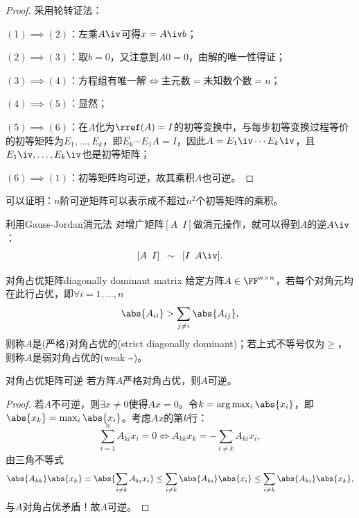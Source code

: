 \begin{proof}
	采用轮转证法：

	$(1)\implies(2)$：左乘$A\iv$可得$x=A\iv b$；

	$(2)\implies(3)$：取$b=0$，又注意到$A0=0$，由解的唯一性得证；

	$(3)\implies(4)$：方程组有唯一解$\iff$主元数$=$未知数个数$=n$；

	$(4)\implies(5)$：显然；

	$(5)\implies(6)$：在$A$化为$\rref(A)=I$的初等变换中，与每步初等变换过程等价的初等矩阵为$E_1,\ldots,E_k$，即$E_k\cdots E_1A=I$，因此$A=E_1\iv\cdots E_k\iv$，且$E_1\iv,\ldots,E_k\iv$也是初等矩阵；

	$(6)\implies(1)$：初等矩阵均可逆，故其乘积$A$也可逆。
\end{proof}

\begin{remark}
	可以证明：$n$阶可逆矩阵可以表示成不超过$n^2$个初等矩阵的乘积。
\end{remark}

\begin{corollary}
	利用Gauss-Jordan消元法
	对增广矩阵$[A\enspace I]$做消元操作，就可以得到$A$的逆$A\iv$：
	\[
		[A\enspace I]\enspace\sim\enspace[I\enspace A\iv].
	\]
\end{corollary}

\begin{definition}
	{对角占优矩阵}{diagonally dominant matrix}
	给定方阵$A\in\FF^{n\times n}$，若每个对角元均在此行占优，即$\forall i=1,\ldots,n$
	\begin{equation}
		\abs{A_{ii}}>\sum_{j\neq i}\abs{A_{ij}},
	\end{equation}
	则称$A$是(严格)对角占优的(strict diagonally dominant)；若上式不等号仅为$\geq$，则称$A$是弱对角占优的(weak \textasciitilde)。
\end{definition}

\begin{theorem}
	{对角占优矩阵可逆}{}
	若方阵$A$严格对角占优，则$A$可逆。
\end{theorem}

\begin{proof}
	若$A$不可逆，则$\exists x\neq 0$使得$Ax=0$。令$k=\arg\max_i\abs{x_i}$，即$\abs{x_k}=\max_i\abs{x_i}$。考虑$Ax$的第$k$行：
	\[
		\sum_{i=1}^nA_{ki}x_i=0\iff A_{kk}x_k=-\sum_{i\neq k}A_{ki}x_i,
	\]
	由三角不等式
	\[
		\abs{A_{kk}}\abs{x_k}=\abs{\sum_{i\neq k}A_{ki}x_i}\leq\sum_{i\neq k}\abs{A_{ki}}\abs{x_i}\leq\sum_{i\neq k}\abs{A_{ki}}\abs{x_k},
	\]
	与$A$对角占优矛盾！故$A$可逆。
\end{proof}

